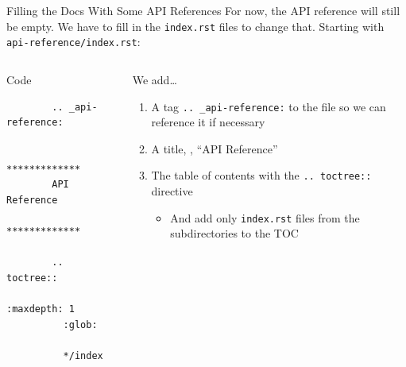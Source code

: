 \begin{frame}[fragile]{Filling the Docs With Some API References}
  For now, the API reference will still be empty. We have to fill in
  the \texttt{index.rst} files to change that. Starting with
  \texttt{api-reference/index.rst}:\\[1em]

  \begin{columns}[onlytextwidth]
    \begin{column}{0.38\textwidth}
      \begin{block}{Code}
      \begin{verbatim}
        .. _api-reference:

        *************
        API Reference
        *************

        .. toctree::
          :maxdepth: 1
          :glob:

          */index
      \end{verbatim}
      \end{block}
    \end{column}
    \hfill
    \begin{column}{0.58\textwidth}
      We add\dots
      \begin{enumerate}
        \setlength{\itemsep}{1.5em}
        \item A tag \texttt{.. \_api-reference:} to the file so we can reference it if necessary
        \item A title, \eg, \enquote{API Reference}
        \item The table of contents with the \texttt{.. toctree::} directive
          \begin{itemize}
            \item And add only \texttt{index.rst} files from the subdirectories to the TOC
          \end{itemize}
      \end{enumerate}
    \end{column}
  \end{columns}
\end{frame}

